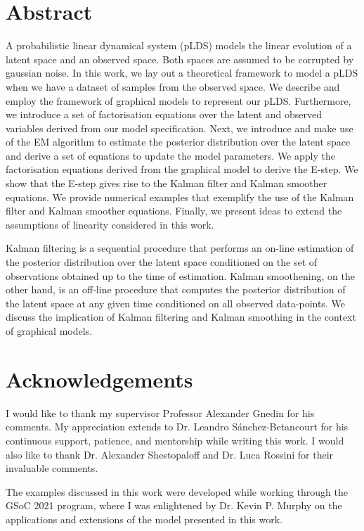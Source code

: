\documentclass[12pt, oneside]{book}
\numberwithin{equation}{section}
\begin{document}
\chapter*{Abstract}
A probabilistic linear dynamical system (pLDS) models the linear evolution of a latent space and an observed space. Both spaces are assumed to be corrupted by gaussian noise. In this work, we lay out a theoretical framework to model a pLDS when we have a dataset of samples from the observed space. We describe and employ the framework of graphical models to represent our pLDS. Furthermore, we introduce a set of factorisation equations over the latent and observed variables derived from our model specification. Next, we introduce and make use of the EM algorithm to estimate the posterior distribution over the latent space and derive a set of equations to update the model parameters. We apply the factorisation equations derived from the graphical model to derive the E-step. We show that the E-step gives rise to the Kalman filter and Kalman smoother equations. We provide numerical examples that exemplify the use of the Kalman filter and Kalman smoother equations. Finally, we present ideas to extend the assumptions of linearity considered in this work.

Kalman filtering is a sequential procedure that performs an on-line estimation of the posterior distribution over the latent space conditioned on the set of observations obtained up to the time of estimation. Kalman smoothening, on the other hand, is an off-line procedure that computes the posterior distribution of the latent space at any given time conditioned on all observed data-points. We discuss the implication of Kalman filtering and Kalman smoothing in the context of graphical models.

\chapter*{Acknowledgements}
I would like to thank my supervisor Professor Alexander Gnedin for his comments.  My appreciation extends to Dr. Leandro S{\'a}nchez-Betancourt for his continuous support, patience, and mentorship while writing this work. I would also like to thank Dr. Alexander Shestopaloff and Dr. Luca Rossini for their invaluable comments.

The examples discussed in this work were developed while working through the GSoC 2021 program, where I was enlightened by Dr. Kevin P. Murphy on the applications and extensions of the model presented in this work.
\end{document}
